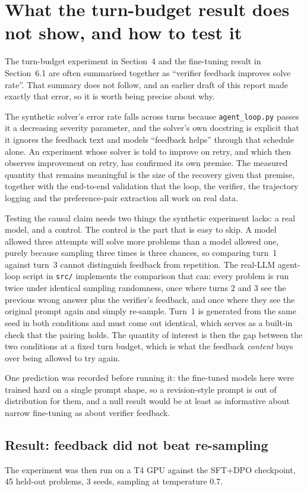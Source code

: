 \documentclass[11pt]{article}
\begin{document}
\section{What the turn-budget result does not show, and how to test it}
The turn-budget experiment in Section~4 and the fine-tuning result in
Section~6.1 are often summarised together as ``verifier feedback improves
solve rate''. That summary does not follow, and an earlier draft of this
report made exactly that error, so it is worth being precise about why.

The synthetic solver's error rate falls across turns because
\texttt{agent\_loop.py} passes it a decreasing severity parameter, and the
solver's own docstring is explicit that it ignores the feedback text and
models ``feedback helps'' through that schedule alone. An experiment whose
solver is told to improve on retry, and which then observes improvement on
retry, has confirmed its own premise. The measured quantity that remains
meaningful is the size of the recovery given that premise, together with
the end-to-end validation that the loop, the verifier, the trajectory
logging and the preference-pair extraction all work on real data.

Testing the causal claim needs two things the synthetic experiment lacks: a
real model, and a control. The control is the part that is easy to skip. A
model allowed three attempts will solve more problems than a model allowed
one, purely because sampling three times is three chances, so comparing
turn~1 against turn~3 cannot distinguish feedback from repetition. The
real-LLM agent-loop script in \texttt{src/} implements the comparison that
can: every problem is run twice under identical sampling randomness, once
where turns 2 and 3 see the previous wrong answer plus the verifier's
feedback, and once where they see the original prompt again and simply
re-sample. Turn~1 is generated from the same seed in both conditions and
must come out identical, which serves as a built-in check that the pairing
holds. The quantity of interest is then the gap between the two conditions
at a fixed turn budget, which is what the feedback \emph{content} buys over
being allowed to try again.

One prediction was recorded before running it: the fine-tuned models here
were trained hard on a single prompt shape, so a revision-style prompt is
out of distribution for them, and a null result would be at least as
informative about narrow fine-tuning as about verifier feedback.

\subsection{Result: feedback did not beat re-sampling}
The experiment was then run on a T4 GPU against the SFT+DPO checkpoint, 45
held-out problems, 3 seeds, sampling at temperature 0.7.
\end{document}
